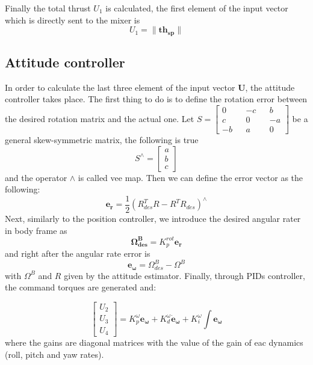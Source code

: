 \noindent
Finally the total thrust $U_1$ is calculated, the first element of the input vector which is directly sent to the mixer is
\begin{equation}
	U_1 =  {\lVert\boldsymbol{th_{sp}}\rVert}
\end{equation}



\subsection{Attitude controller}
\label{sec:attcontrol}
In order to calculate the last three element of the input vector $\boldsymbol{U}$, the attitude controller takes place. The first thing to do is to define the rotation error between the desired rotation matrix and the actual one. Let $S = \begin{bmatrix}
0  && -c && b  \\
c  && 0  && -a \\
-b && a  && 0 
\end{bmatrix}$ be a general skew-symmetric matrix, the following is true
\begin{equation}
	S^{\wedge} = \begin{bmatrix}a\\b\\c\end{bmatrix}
\end{equation}
and the operator $\wedge$ is called vee map. Then we can define the error vector as the following:
\begin{equation}
	\boldsymbol{e_r} = \frac{1}{2} (R^T_{des} R - R^TR_{des} )^\wedge
\end{equation}
Next, similarly to the position controller, we introduce the desired angular rater in body frame as
\begin{equation}
	\boldsymbol{\Omega^B_{des}} = K_p^{rot} \boldsymbol{e_r} 
\end{equation}
and right after the angular rate error is 
\begin{equation}
	\boldsymbol{e_\omega} = \Omega^B_{des} - \Omega^B
\end{equation}
with $\Omega^B$ and $R$ given by the attitude estimator.
Finally, through PIDs controller, the command torques are generated and:

\begin{equation}
	\begin{bmatrix}
	U_2\\U_3\\U_4
	\end{bmatrix} =  K_p^{\omega}  \boldsymbol{e_\omega} + K_d^{\omega} { \boldsymbol{\dot{e}_\omega}} + K_i^{\omega} \int \boldsymbol{e_\omega}
\end{equation}
where the gains are diagonal matrices with the value of the gain of eac dynamics (roll, pitch and yaw rates).


